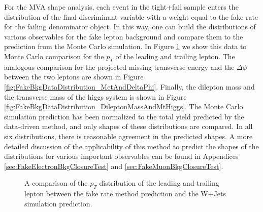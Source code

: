 For the MVA shape analysis, each event in the tight+fail sample enters the 
distribution of the final discriminant variable with a weight equal to the 
fake rate for the failing denominator object. In this way, one can build
the distributions of various observables for the fake lepton background
and compare them to the prediction from the Monte Carlo simulation. 
In Figure \ref{fig:FakeBkgDataDistribution_LeptonPt} we show this data to Monte Carlo 
comparison for the $p_{T}$ of the leading and trailing lepton. The analogous comparison
for the projected missing transverse energy and the $\Delta\phi$ between the two 
leptons are shown in Figure \ref{fig:FakeBkgDataDistribution_MetAndDeltaPhi}. Finally,
the dilepton mass and the transverse mass of the higgs system is shown in 
Figure \ref{fig:FakeBkgDataDistribution_DileptonMassAndMtHiggs}. The Monte Carlo simulation
prediction has been normalized to the total yield predicted by the data-driven method,
and only shapes of these distributions are compared. In all six distributions, there is
reasonable agreement in the predicted shapes. A more detailed 
discussion of the applicability of this method to predict the shapes of 
the distributions for various important observables can be found in
Appendices \ref{sec:FakeElectronBkgClosureTest} and 
\ref{sec:FakeMuonBkgClosureTest}.


\begin{figure}[!htbp]
\begin{center}
\caption{A comparison of the $p_{T}$ distribution of the leading and trailing lepton
between the fake rate method prediction and the W+Jets simulation prediction. }
\label{fig:FakeBkgDataDistribution_LeptonPt}
\end{center}
\end{figure}

